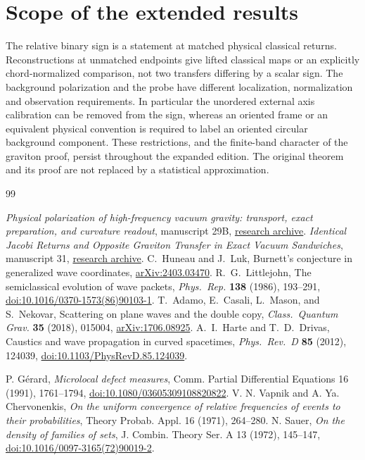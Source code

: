 \documentclass[11pt]{article}
\begin{document}
\section{Scope of the extended results}
The relative binary sign is a statement at matched physical
classical returns. Reconstructions at unmatched endpoints
give lifted classical maps or an explicitly chord-normalized
comparison, not two transfers differing by a scalar sign.
The background polarization and the probe have different
localization, normalization and observation requirements.
In particular the unordered external axis calibration can be
removed from the sign, whereas an oriented frame or an equivalent
physical convention is required to label an oriented circular
background component. These restrictions, and the finite-band
character of the graviton proof, persist throughout the expanded
edition. The original theorem and its proof are not replaced by a
statistical approximation.

\begin{thebibliography}{99}
\raggedright
{} \emph{Physical polarization of high-frequency vacuum gravity: transport, exact preparation, and curvature readout}, manuscript 29B, \href{https://github.com/g3173028019-beep/ai-automated-quantum-gravity-research/tree/main/papers/29b-high-frequency-graviton-polarization}{research archive}.
 \emph{Identical Jacobi Returns and Opposite Graviton Transfer in Exact Vacuum Sandwiches}, manuscript 31, \href{https://github.com/g3173028019-beep/ai-automated-quantum-gravity-research/tree/main/papers/31-graviton-metaplectic-transfer}{research archive}.
 C.~Huneau and J.~Luk, Burnett's conjecture in generalized wave coordinates, \href{https://arxiv.org/abs/2403.03470}{arXiv:2403.03470}.
 R.~G.~Littlejohn, The semiclassical evolution of wave packets, \emph{Phys.\ Rep.} \textbf{138} (1986), 193--291, \href{https://doi.org/10.1016/0370-1573(86)90103-1}{doi:10.1016/0370-1573(86)90103-1}.
 T.~Adamo, E.~Casali, L.~Mason, and S.~Nekovar, Scattering on plane waves and the double copy, \emph{Class.\ Quantum Grav.} \textbf{35} (2018), 015004, \href{https://arxiv.org/abs/1706.08925}{arXiv:1706.08925}.
 A.~I.~Harte and T.~D.~Drivas, Caustics and wave propagation in curved spacetimes, \emph{Phys.\ Rev.\ D} \textbf{85} (2012), 124039, \href{https://doi.org/10.1103/PhysRevD.85.124039}{doi:10.1103/PhysRevD.85.124039}.

 P. G\'erard, \emph{Microlocal defect measures}, Comm. Partial Differential Equations 16 (1991), 1761--1794, \href{https://doi.org/10.1080/03605309108820822}{doi:10.1080/03605309108820822}.
 V. N. Vapnik and A. Ya. Chervonenkis, \emph{On the uniform convergence of relative frequencies of events to their probabilities}, Theory Probab. Appl. 16 (1971), 264--280.
 N. Sauer, \emph{On the density of families of sets}, J. Combin. Theory Ser. A 13 (1972), 145--147, \href{https://doi.org/10.1016/0097-3165(72)90019-2}{doi:10.1016/0097-3165(72)90019-2}.
\end{thebibliography}
\end{document}
